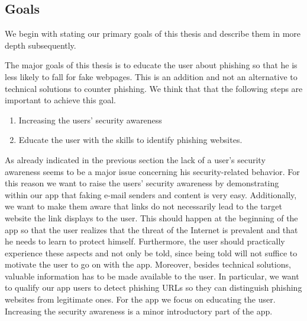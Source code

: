 \subsection{Goals}
\label{s:goals}
We begin with stating our primary goals of this thesis and describe them in more depth subsequently.


The major goals of this thesis is to educate the user about phishing so that he is less likely to fall for fake webpages.
 This is an addition and not an alternative to technical solutions to counter phishing.
 We think that that the following steps are important to achieve this goal.


\begin{enumerate}
	\item Increasing the users' security awareness
	\item Educate the user with the skills to identify phishing websites.

\end{enumerate}

As already indicated in the previous section the lack of a user's security awareness seems to be a major issue concerning his security-related behavior.
 For this reason we want to raise the users' security awareness by demonstrating within our app that faking e-mail senders and content is very easy.
 Additionally, we want to make them aware that links do not necessarily lead to the target website the link displays to the user.
 This should happen at the beginning of the app so that the user realizes that the threat of the Internet is prevalent and that he needs to learn to protect himself.
 Furthermore, the user should practically experience these aspects and not only be told, since being told will not suffice to motivate the user to go on with the app.
 Moreover, besides technical solutions, valuable information has to be made available to the user.
 In particular, we want to qualify our app users to detect phishing URLs so they can distinguish phishing websites from legitimate ones.
 For the app we focus on educating the user.
 Increasing the security awareness is a minor introductory part of the app.



